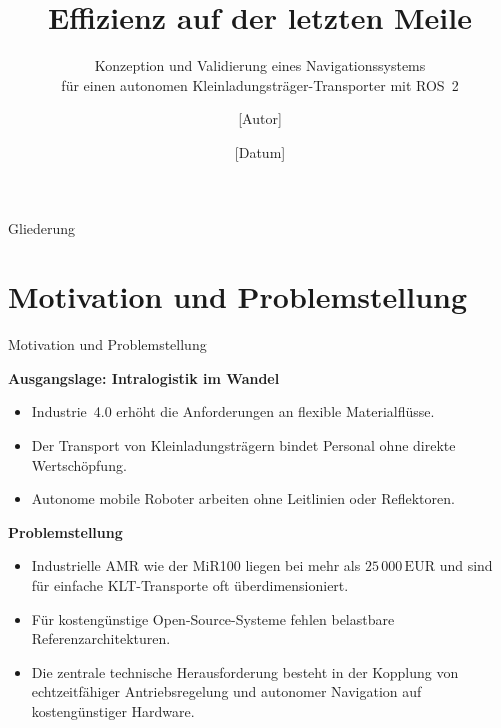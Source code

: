 \documentclass[aspectratio=169]{beamer}
\title{Effizienz auf der letzten Meile}
\subtitle{Konzeption und Validierung eines Navigationssystems\\
          für einen autonomen Kleinladungsträger-Transporter mit ROS~2}
\author{[Autor]}
\date{[Datum]}
\institute{[Hochschule / Fachbereich]}
\begin{document}

\maketitle


\begin{frame}{Gliederung}
  \tableofcontents
\end{frame}

\section{Motivation und Problemstellung}

\begin{frame}{Motivation und Problemstellung}

  \textbf{Ausgangslage: Intralogistik im Wandel}
  \begin{itemize}
    \item Industrie~4.0 erhöht die Anforderungen an flexible Materialflüsse.
    \item Der Transport von Kleinladungsträgern bindet Personal ohne
          direkte Wertschöpfung.
    \item Autonome mobile Roboter arbeiten ohne Leitlinien oder Reflektoren.
  \end{itemize}

  \vspace{0.5em}
  \textbf{Problemstellung}
  \begin{itemize}
    \item Industrielle AMR wie der MiR100 liegen bei mehr als
          $25\,000\,\mathrm{EUR}$ und sind für einfache KLT-Transporte
          oft überdimensioniert.
    \item Für kostengünstige Open-Source-Systeme fehlen belastbare
          Referenzarchitekturen.
    \item Die zentrale technische Herausforderung besteht in der Kopplung
          von echtzeitfähiger Antriebsregelung und autonomer Navigation
          auf kostengünstiger Hardware.
  \end{itemize}

\end{frame}
\end{document}
